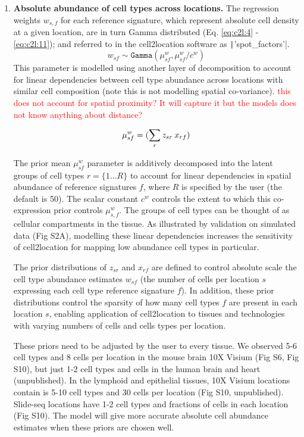\documentclass[11pt,a4paper]{article}
\newcommand{\red}{\textcolor{red}}
\begin{document}
\begin{enumerate}
    \item \textbf{Absolute abundance of cell types across locations.}
    The regression weights $w_{s,f}$ for each reference signature, which represent absolute cell density at a given location, are in turn Gamma distributed (Eq. \ref{eq:c2l:4} - \ref{eq:c2l:11}); and referred to in the cell2location software as \texttt|'spot_factors'|. \newline
    \begin{equation} \label{eq:c2l:4}
    w_{sf} \sim \mathtt{Gamma}({\mu}^{w}_{sf}, {\mu}^{w}_{sf} / c^{w})
    \end{equation}
    This parameter is modelled using another layer of decomposition to account for linear dependencies between cell type abundance across locations with similar cell composition (note this is not modelling spatial co-variance). \red{this does not account for spatial proximity? It will capture it but the models does not know anything about distance?}
    
    \begin{equation} \label{eq:c2l:5}
    {\mu}^{w}_{sf} = (\sum_{r} {z_{sr} \: x_{rf}})\\
    \end{equation}
    
    The prior mean ${\mu}^{w}_{sf}$ parameter is additively decomposed into the latent groups of cell types $r=\{1...R\}$ to account for linear dependencies in spatial abundance of reference signatures $f$, where $R$ is specified by the user (the default is 50). The scalar constant $c^{w}$ controls the extent to which this co-expression prior controls $\mu^{w}_{s,f}$. The groups of cell types can be thought of as cellular compartments in the tissue. As illustrated by validation on simulated data (Fig S2A), modelling these linear dependencies increases the sensitivity of cell2location for mapping low abundance cell types in particular.
    
    The prior distributions of $z_{sr}$ and $x_{rf}$ are defined to control absolute scale the cell type abundance estimates $w_{sf}$ (the number of cells per location $s$ expressing each cell type reference signature $f$). In addition, these prior distributions control the sparsity of how many cell types $f$ are present in each location $s$, enabling application of cell2location to tissues and technologies with varying numbers of cells and cells types per location.
    
    These priors need to be adjusted by the user to every tissue. We observed 5-6 cell types and 8 cells per location in the mouse brain 10X Visium (Fig S6, Fig S10), but just 1-2 cell types and cells in the human brain and heart (unpublished). In the lymphoid and epithelial tissues, 10X Visium locations contain is 5-10 cell types and 30 cells per location (Fig S10, unpublished). Slide-seq locations have 1-2 cell types and fractions of cells in each location (Fig S10). The model will give more accurate absolute cell abundance estimates when these priors are chosen well.
    

\end{enumerate}
\end{document}
